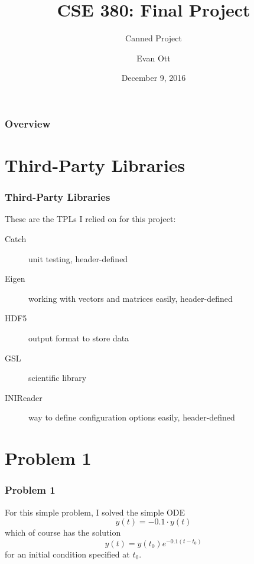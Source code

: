 \documentclass{beamer}
\title[Canned Project]{CSE 380: Final Project} %
\subtitle{Canned Project}
\author{Evan Ott} %
\date{December 9, 2016} %
\begin{document}
\begin{frame}
\titlepage %
\end{frame}

\begin{frame}
\frametitle{Overview} %
\tableofcontents %
\end{frame}


\section{Third-Party Libraries}
\begin{frame}
\frametitle{Third-Party Libraries}
These are the TPLs I relied on for this project:
\begin{description}
\item[Catch] unit testing, header-defined
\item[Eigen] working with vectors and matrices easily, header-defined
\item[HDF5] output format to store data
\item[GSL] scientific library
\item[INIReader] way to define configuration options easily, header-defined 
\end{description}
\end{frame}


\section{Problem 1}
\begin{frame}
\frametitle{Problem 1}
For this simple problem, I solved the simple ODE
$$\dot{y}(t) = -0.1\cdot y(t)$$
which of course has the solution
$$y(t)=y(t_0) e ^{-0.1(t - t_0)}$$
for an initial condition specified at $t_0$.
\end{frame}
\end{document}
